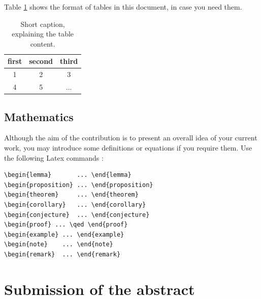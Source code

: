 \documentclass{dcsm}
\begin{document}
Table \ref{tab_example} shows the format of tables in this document, in case you need them.


\begin{table}[ht]
	\centering
		\begin{tabular}{|ccc|}
       \hline
           first & second & third  \\
	     \hline
        1 & 2 & 3 \\
        4 & 5 & ... \\
  \hline
		\end{tabular}
 \caption{Short caption, explaining the table content.}
 \label{tab_example}
\end{table}



\subsection{Mathematics}

Although the aim of the contribution is to present an overall idea of your current work,
you may introduce some definitions or equations if you require them.
Use the following Latex commands \cite{Lamport}:


\begin{verbatim}
\begin{lemma}       ... \end{lemma}
\begin{proposition} ... \end{proposition}
\begin{theorem}     ... \end{theorem}
\begin{corollary}   ... \end{corollary}
\begin{conjecture}  ... \end{conjecture}
\begin{proof} ... \qed \end{proof}
\begin{example} ... \end{example}
\begin{note}    ... \end{note}
\begin{remark}  ... \end{remark}
\end{verbatim}




\section{Submission of the abstract}
\end{document}
